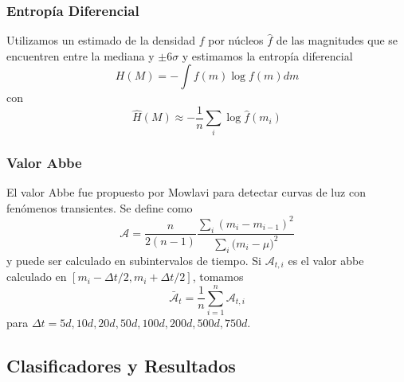 \documentclass{beamer}
\begin{document}
\begin{frame}
  \frametitle{Entropía Diferencial}
  Utilizamos un estimado de la densidad $f$ por núcleos $\hat{f}$ de las magnitudes que se encuentren entre la mediana y $\pm 6\sigma$ y estimamos la entropía diferencial 
  \begin{equation}
    H(M) = -\int f(m)\log f(m) dm
  \end{equation}
  con 
  \begin{equation}
    \hat{H}(M) \approx -\frac{1}{n}\sum_i\log\hat{f}(m_i)
  \end{equation}
\end{frame}

\begin{frame}
  \frametitle{Valor Abbe}
  El valor Abbe fue propuesto por Mowlavi \cite{mowlavi_searching_2014} para detectar curvas de luz con fenómenos transientes. Se define como
  \begin{equation}
    \mathcal{A}=\frac{n}{2(n-1)}\frac{\sum_{i}{(m_{i}-m_{i-1})^{2}}}{\sum_{i}{(m_{i}-\mu})^2}
  \end{equation}
  y puede ser calculado en subintervalos de tiempo. Si $\mathcal{A}_{t,i}$ es el valor abbe calculado en $[m_i-\Delta t/2, m_i + \Delta t/2]$, tomamos
  \begin{equation}
    \bar{\mathcal{A}}_t = \frac{1}{n}\sum_{i=1}^{n}\mathcal{A}_{t,i}
  \end{equation}
  para $\Delta t = 5d, 10d, 20d, 50d, 100d, 200d, 500d, 750d.$
\end{frame}



\subsection{Clasificadores y Resultados}
\end{document}

